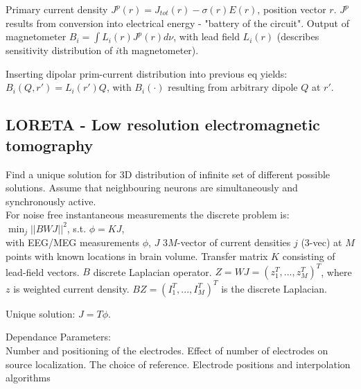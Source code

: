 Primary current density $J^p(r)=J_{tot}(r) - \sigma(r)E(r)$, position vector $r$. $J^p$ results from conversion into electrical energy - "battery of the circuit". Output of magnetometer $B_i = \int L_i(r)J^p(r)d\nu$, with lead field $L_i(r)$ (describes sensitivity distribution of $i$th magnetometer).\vs

Inserting dipolar prim-current distribution into previous eq yields: $B_i(Q,r')=L_i(r')Q$, with $B_i(\cdot)$ resulting from arbitrary dipole $Q$ at $r'$.\vs

\subsection{LORETA - Low resolution electromagnetic tomography}
Find a unique solution for 3D distribution of infinite set of different possible solutions. Assume that neighbouring neurons are simultaneously and synchronously active.\\ 
For noise free instantaneous measurements the discrete problem is:\\
$\min_j||BWJ||^2$, s.t. $\phi = KJ$, \\
with EEG/MEG measurements $\phi$, $J$ 3$M$-vector of current densities $j$ (3-vec) at $M$ points with known locations in brain volume. Transfer matrix $K$ consisting of lead-field vectors. $B$ discrete Laplacian operator. $Z=WJ=(z_1^T,...,z_M^T)^T$, where $z$ is weighted current density. $BZ=(I_1^T,...,I_M^T)^T$ is the discrete Laplacian.\vs

Unique solution: $\hat{J}=T\phi$.\vs

Dependance Parameters:\\
Number and positioning of the electrodes. Effect of number of electrodes on source localization. The choice of reference. Electrode positions and interpolation algorithms
